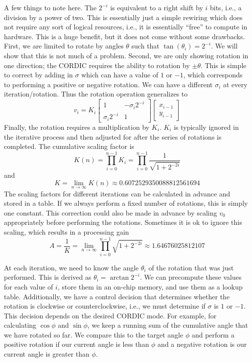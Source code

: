 A few things to note here. The $2^{-i}$ is equivalent to a right shift by $i$ bits, i.e., a division by a power of two. This is essentially just a simple rewiring which does not require any sort of logical resources, i.e., it is essentially ``free'' to compute in hardware. This is a huge benefit, but it does not come without some drawbacks. First, we are limited to rotate by angles $\theta$ such that $\tan(\theta_i) = 2^{-i}$. We will show that this is not much of a problem. Second, we are only showing rotation in one direction; the CORDIC requires the ability to rotation by $\pm \theta$. This is simple to correct by adding in $\sigma$ which can have a value of $1$ or $-1$, which corresponds to performing a positive or negative rotation. We can have a different $\sigma_i$ at every iteration/rotation. Thus the rotation operation generalizes to
\begin{equation}
v_i = K_i \begin{bmatrix} 1 & -\sigma_i 2^{-i} \\ \sigma_i 2^{-i} & 1 \end{bmatrix} \begin{bmatrix} x_{i-1} \\ y_{i-1} \end{bmatrix}
\end{equation}
Finally, the rotation requires a multiplication by $K_i$.  $K_i$ is typically ignored in the iterative process and then adjusted for after the series of rotations is completed. The cumulative scaling factor is
\begin{equation}
K(n) = \prod_{i=0}^{n-1} K_i  = \prod_{i=0}^{n-1}\frac {1}{\sqrt{1 + 2^{-2i}}}
\end{equation} and  
\begin{equation}
K = \lim_{n \to \infty}K(n) \approx 0.6072529350088812561694
\end{equation}
The scaling factors for different iterations can be calculated in advance and stored in a table. If we always perform a fixed number of rotations, this is simply one constant. This correction could also be made in advance by scaling $v_0$ appropriately before performing the rotations. Sometimes it is ok to ignore this scaling, which results in a processing gain
\begin{equation}
A = \frac{1}{K} = \lim_{n \to \infty} \prod_{i=0}^{n-1} {\sqrt{1 + 2^{-2i}}}\approx 1.64676025812107
\label{eq:cordicgain}
\end{equation}

At each iteration, we need to know the angle $\theta_i$ of the rotation that was just performed. This is derived as $\theta_i = \arctan 2^{-i}$. We can precompute these values for each value of $i$, store them in an on-chip memory, and use them as a lookup table. Additionally, we have a control decision that determines whether the rotation is clockwise or counterclockwise, i.e., we must determine if $\sigma$ is $1$ or $-1$. This decision depends on the desired CORDIC mode. For example, for calculating $\cos \phi$ and $\sin \phi$, we keep a running sum of the cumulative angle that we have rotated so far. We compare this to the target angle $\phi$ and perform a positive rotation if our current angle is less than $\phi$ and a negative rotation is our current angle is greater than $\phi$. 

